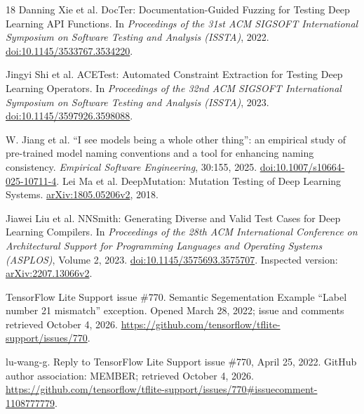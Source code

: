 \documentclass[10pt,conference]{IEEEtran}
\begin{document}
\begin{thebibliography}{18}
 Danning Xie et al. DocTer: Documentation-Guided Fuzzing for Testing Deep Learning API Functions. In \emph{Proceedings of the 31st ACM SIGSOFT International Symposium on Software Testing and Analysis (ISSTA)}, 2022. \href{https://doi.org/10.1145/3533767.3534220}{doi:10.1145/3533767.3534220}.

 Jingyi Shi et al. ACETest: Automated Constraint Extraction for Testing Deep Learning Operators. In \emph{Proceedings of the 32nd ACM SIGSOFT International Symposium on Software Testing and Analysis (ISSTA)}, 2023. \href{https://doi.org/10.1145/3597926.3598088}{doi:10.1145/3597926.3598088}.

 W. Jiang et al. ``I see models being a whole other thing'': an empirical study of pre-trained model naming conventions and a tool for enhancing naming consistency. \emph{Empirical Software Engineering}, 30:155, 2025. \href{https://doi.org/10.1007/s10664-025-10711-4}{doi:10.1007/s10664-025-10711-4}.
 Lei Ma et al.
DeepMutation: Mutation Testing of Deep Learning Systems.
\href{https://arxiv.org/abs/1805.05206v2}{arXiv:1805.05206v2}, 2018.

 Jiawei Liu et al.
NNSmith: Generating Diverse and Valid Test Cases for Deep Learning Compilers.
In \emph{Proceedings of the 28th ACM International Conference on Architectural
Support for Programming Languages and Operating Systems (ASPLOS)}, Volume 2,
2023.
\href{https://doi.org/10.1145/3575693.3575707}{doi:10.1145/3575693.3575707}.
Inspected version: \href{https://arxiv.org/abs/2207.13066v2}{arXiv:2207.13066v2}.

 TensorFlow Lite Support issue \#770.
Semantic Segementation Example ``Label number 21 mismatch'' exception.
Opened March 28, 2022; issue and comments retrieved October 4, 2026.
\url{https://github.com/tensorflow/tflite-support/issues/770}.

 lu-wang-g.
Reply to TensorFlow Lite Support issue \#770, April 25, 2022.
GitHub author association: MEMBER; retrieved October 4, 2026.
\url{https://github.com/tensorflow/tflite-support/issues/770#issuecomment-1108777779}.
\end{thebibliography}
\end{document}
